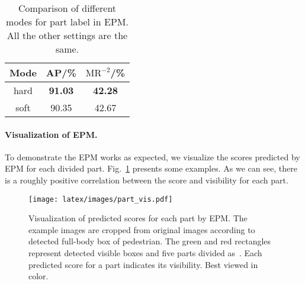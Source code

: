 \documentclass[10pt,twocolumn,letterpaper]{article}
\begin{document}
\begin{table}[ht]
	\centering
  \caption{Comparison of different modes for part label in EPM. All the other settings are the same.
	}
	\label{tbl:crowd_label_EPM}
	\begin{tabular}{c|cc}
		\toprule
		 Mode & AP/\% & $\text{MR}^{-2}$/\% \\
		\hline
		hard & \textbf{91.03} & \textbf{42.28} \\
		soft & 90.35 & 42.67 \\
		\bottomrule
	\end{tabular}
\end{table}

\paragraph{Visualization of EPM.} To demonstrate the EPM works as expected, we visualize the scores predicted by EPM for each divided part. Fig.~\ref{fig:vis_part} presents some examples. As we can see, there is a roughly positive correlation between the score and visibility for each part.

\begin{figure}[!t]
\begin{center}
 \texttt{[image: latex/images/part\_vis.pdf]}
\end{center}
   \caption{Visualization of predicted scores for each part by EPM. The example images are cropped from original images according to detected full-body box of pedestrian. The green and red rectangles represent detected visible boxes and five parts divided as~\cite{zhang2018Occlusionaware}. Each predicted score for a part indicates its visibility. Best viewed in color.}
\label{fig:vis_part}
\end{figure}
\end{document}
